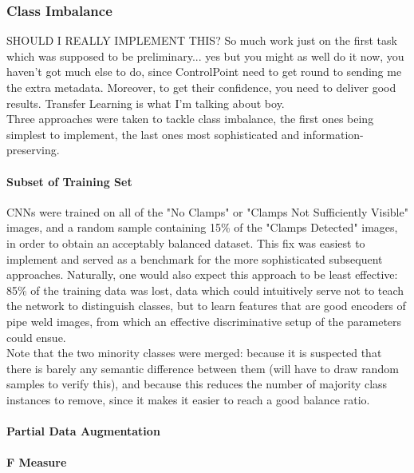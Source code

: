 \documentclass[a4paper,11pt]{article}
\begin{document}
\subsubsection{Class Imbalance}

SHOULD I REALLY IMPLEMENT THIS? So much work just on the first task which was supposed to be preliminary... yes but you might as well do it now, you haven't got much else to do, since ControlPoint need to get round to sending me the extra metadata. Moreover, to get their confidence, you need to deliver good results. Transfer Learning is what I'm talking about boy. \\

Three approaches were taken to tackle class imbalance, the first ones being simplest to implement, the last ones most sophisticated and information-preserving. \\

\paragraph{Subset of Training Set}

CNNs were trained on all of the "No Clamps" or "Clamps Not Sufficiently Visible" images, and a random sample containing 15\% of the "Clamps Detected" images, in order to obtain an acceptably balanced dataset. This fix was easiest to implement and served as a benchmark for the more sophisticated subsequent approaches. Naturally, one would also expect this approach to be least effective: 85\% of the training data was lost, data which could intuitively serve not to teach the network to distinguish classes, but to learn features that are good encoders of pipe weld images, from which an effective discriminative setup of the parameters could ensue. \\

Note that the two minority classes were merged: because it is suspected that there is barely any semantic difference between them (will have to draw random samples to verify this), and because this reduces the number of majority class instances to remove, since it makes it easier to reach a good balance ratio.

\paragraph{Partial Data Augmentation}

\paragraph{F Measure}
\end{document}
